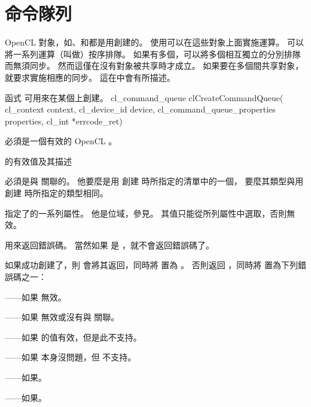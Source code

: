 \section{命令隊列}

OpenCL 對象，如、和都是用創建的。
使用可以在這些對象上面實施運算。
可以將一系列運算（叫做）按序排隊。
如果有多個，可以將多個相互獨立的分別排隊而無須同步。
然而這僅在沒有對象被共享時才成立。
如果要在多個間共享對象，就要求實施相應的同步。
這在中會有所描述。

函式  可用來在某個上創建。
\startclc
cl_command_queue clCreateCommandQueue(
			cl_context context,
			cl_device_id device,
			cl_command_queue_properties properties,
			cl_int *errcode_ret)
\stopclc

 必須是一個有效的 OpenCL 。

\startbuffer[tblcmdqprop]
的有效值及其描述
\stopbuffer
{}
{}

 必須是與  關聯的。
他要麼是用  創建  時所指定的清單中的一個，
要麼其類型與用  創建  時所指定的類型相同。

 指定了的一系列屬性。
他是位域，參見。
其值只能從所列屬性中選取，否則無效。

 用來返回錯誤碼。
當然如果  是 ，就不會返回錯誤碼了。

如果成功創建了，則  會將其返回，同時將  置為 。
否則返回 ，同時將  置為下列錯誤碼之一：
\startigBase
\item {}——如果  無效。
\item {}——如果  無效或沒有與  關聯。
\item {}——如果  的值有效，但是此不支持。
\item {}——如果  本身沒問題，但  不支持。
\item {}——如果\scdevfailres。
\item {}——如果\schostfailres。
\stopigBase


